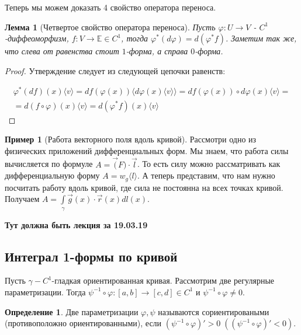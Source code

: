 \documentclass[a5paper]{article}
\newcounter{through}
\theoremstyle{plain}
\newtheorem{lemma}[through]{Лемма}
\theoremstyle{definition}
\newtheorem{definition}[through]{Определение}
\newtheorem{example}[through]{Пример}
\numberwithin{through}{section}
\numberwithin{equation}{section}
\begin{document}
Теперь мы можем доказать 4 свойство оператора переноса.

\begin{lemma}[Четвертое свойство оператора переноса]
	Пусть $\varphi : U \to V$ - $C^1$-диффеоморфизм, $f : V \to \mathbb{E} \in C^1$, тогда $\varphi^{*}(d \varphi) = d (\varphi^{*} f)$. Заметим так же, что слева от равенства стоит $1$-форма, а справа $0$-форма.
\end{lemma}

\begin{proof}
	Утверждение следует из следующей цепочки равенств:
	
	\begin{align*}
		\varphi^{*}(df)(x) \langle v \rangle  = df (\varphi (x)) \langle d\varphi(x) \langle v \rangle \rangle = df (\varphi (x)) \circ d \varphi(x) \langle v \rangle =\\ = d (f \circ \varphi )(x) \langle v \rangle = d(\varphi^{*}f)(x) \langle v \rangle
	\end{align*}
\end{proof}

\begin{example}[Работа векторного поля вдоль кривой]
	Рассмотри одно из физических приложений дифференциальных форм. Мы знаем, что работа силы вычисляется по формуле $A = \vec(F) \cdot \vec{l}$. То есть силу можно рассматривать как дифференциальную форму $A = w_g \langle l \rangle$. А теперь представим, что нам нужно посчитать работу вдоль кривой, где сила не постоянна на всех точках кривой. Получаем $A = \int\limits_{\gamma} \vec{g}(x) \cdot \vec{r}(x) d l(x)$.
\end{example}

\textbf{Тут должна быть лекция за 19.03.19} %

\subsection{Интеграл 1-формы по кривой} %

Пусть $\gamma - C^1$-гладкая ориентированная кривая. Рассмотрим две регулярные параметризации. Тогда $\psi^{-1} \circ \varphi : [a, b] \to [c, d] \in C^1$ и $\psi^{-1} \circ \varphi \not= 0$.

\begin{definition}
	Две параметризации $\varphi, \psi$ называются сориентироваными (противоположно ориентированными), если $(\psi^{-1} \circ \varphi)' > 0 \; ((\psi^{-1} \circ \varphi)' < 0)$.
\end{definition}
\end{document}
